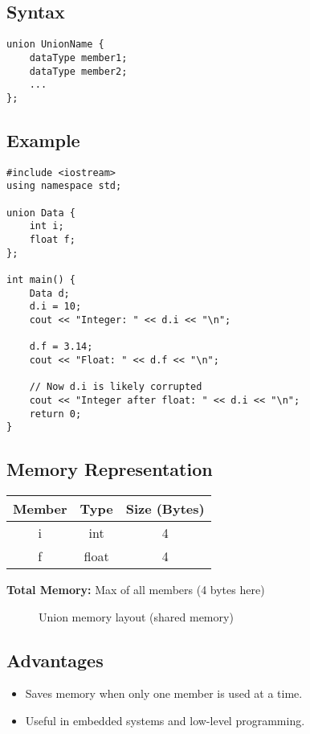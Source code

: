 \subsection*{Syntax}
\begin{lstlisting}[caption=Syntax of union]
union UnionName {
    dataType member1;
    dataType member2;
    ...
};
\end{lstlisting}

\subsection*{Example}
\begin{lstlisting}[caption=C++ Code using union]
#include <iostream>
using namespace std;

union Data {
    int i;
    float f;
};

int main() {
    Data d;
    d.i = 10;
    cout << "Integer: " << d.i << "\n";

    d.f = 3.14;
    cout << "Float: " << d.f << "\n";

    // Now d.i is likely corrupted
    cout << "Integer after float: " << d.i << "\n";
    return 0;
}
\end{lstlisting}

\subsection*{Memory Representation}
\begin{center}
\begin{tabular}{|c|c|c|}
\hline
Member & Type & Size (Bytes) \\
\hline
i & int & 4 \\
f & float & 4 \\
\hline
\end{tabular}
\end{center}
\vspace{0.2cm}
\textbf{Total Memory:} Max of all members (4 bytes here)

\begin{figure}[H]
\centering
{}
\caption{Union memory layout (shared memory)}
\end{figure}


\subsection*{Advantages}
\begin{itemize}
  \item Saves memory when only one member is used at a time.
  \item Useful in embedded systems and low-level programming.
\end{itemize}

